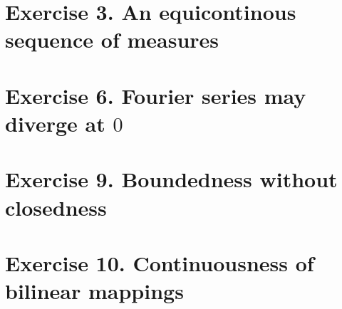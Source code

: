 \section{Exercise 3. An equicontinous sequence of measures}

\section{Exercise 6. Fourier series may diverge at $0$}

\section{Exercise 9. Boundedness without closedness}

\section{Exercise 10. Continuousness of bilinear mappings}

%